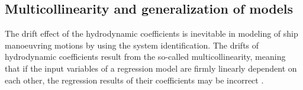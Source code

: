 \subsection{Multicollinearity and generalization of models} \label{sec:multicollinearity}
The drift effect of the hydrodynamic coefficients is inevitable in modeling of ship manoeuvring motions by using the system identification. The drifts of hydrodynamic coefficients result from the so-called multicollinearity, meaning that if the input variables of a regression model are firmly linearly dependent on each other, the regression results of their coefficients may be incorrect \cite{luoParameterIdentifiabilityShip2016}.
